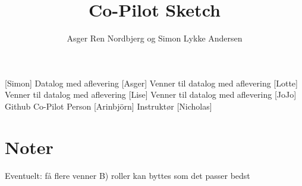 \documentclass[a4paper,11pt]{article}
\title{Co-Pilot Sketch} %
\author{Asger Ren Nordbjerg og Simon Lykke Andersen}
\begin{document}
\maketitle

\begin{roles}
[Simon] Datalog med aflevering 
[Asger] Venner til datalog med aflevering
[Lotte] Venner til datalog med aflevering
[Lise] Venner til datalog med aflevering
[JoJo] Github Co-Pilot Person
[Arinbjörn] Instruktør
[Nicholas]
\end{roles} 

\section*{Noter}
Eventuelt: få flere venner B)
roller kan byttes som det passer bedst

\begin{props}
\end{props}
\end{document}
